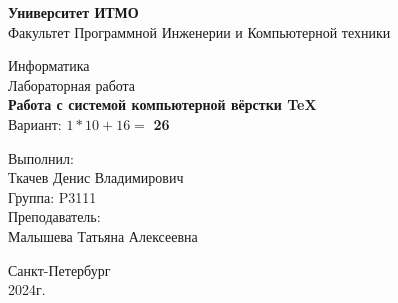 % 
\begin{center}
    \textbf{Университет ИТМО}\\
    \vspace{1em}
    Факультет Программной Инженерии и Компьютерной техники
    \vspace{9em}
    
    {\Large Информатика}\\[1em]
    {\Large Лабораторная работа }\\[1em]
    {\Large \textbf{Работа с системой компьютерной вёрстки \TeX}}\\[1em]
    Вариант: $1 * 10 + 16 =$ \textbf{26}
\end{center}

\vspace{6em}

\begin{flushright}
    Выполнил: \\
    Ткачев Денис Владимирович\\
    Группа: P3111 \\
    Преподаватель: \\
    Малышева Татьяна Алексеевна \\
\end{flushright}
\vspace{10em}
\vfill
\begin{center}
Санкт-Петербург\\
2024г.
\end{center}
\clearpage
% 